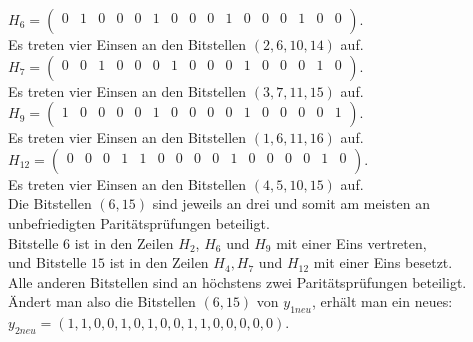\begin{Beispiel}
        $H_6= \left( \begin{array}{rrrrrrrrrrrrrrrr}
            0 & 1 & 0 & 0 & 0 & 1 & 0 & 0 & 0 & 1 & 0 & 0 & 0 & 1 & 0 & 0 \\
           \end{array}\right). 
        $\\
        Es treten vier Einsen an den Bitstellen $(2, 6, 10, 14)$ auf.\\
        
        $H_7= \left( \begin{array}{rrrrrrrrrrrrrrrr}
            0 & 0 & 1 & 0 & 0 & 0 & 1 & 0 & 0 & 0 & 1 & 0 & 0 & 0 & 1 & 0 \\
           \end{array}\right). 
        $\\
        Es treten vier Einsen an den Bitstellen $(3, 7, 11, 15)$ auf.\\
        
        $H_9= \left( \begin{array}{rrrrrrrrrrrrrrrr}
            1 & 0 & 0 & 0 & 0 & 1 & 0 & 0 & 0 & 0 & 1 & 0 & 0 & 0 & 0 & 1 \\
           \end{array}\right). 
        $\\
        Es treten vier Einsen an den Bitstellen $(1, 6, 11, 16)$ auf.\\
        
        $H_{12}= \left( \begin{array}{rrrrrrrrrrrrrrrr}
            0 & 0 & 0 & 1 & 1 & 0 & 0 & 0 & 0 & 1 & 0 & 0 & 0 & 0 & 1 & 0 \\
           \end{array}\right). 
        $\\
        Es treten vier Einsen an den Bitstellen $(4, 5, 10, 15)$ auf.\\
        
        Die Bitstellen $(6, 15)$ sind jeweils an drei und somit am meisten an unbefriedigten Paritätsprüfungen beteiligt.\\ 
        Bitstelle $6$ ist in den Zeilen $H_2$, $H_6$ und $H_9$ mit einer Eins vertreten,\\ 
        und Bitstelle $15$ ist in den Zeilen $H_4, H_7$ und $H_{12}$ mit einer Eins besetzt.\\
        Alle anderen Bitstellen sind an höchstens zwei Paritätsprüfungen beteiligt.\\
         
        Ändert man also die Bitstellen $(6, 15)$ von $y_{1neu}$, erhält man ein neues:\\
        $y_{2neu} = (1,1,0,0,1,0,1,0,0,1,1,0,0,0,0,0).$\\
        

\end{Beispiel}
